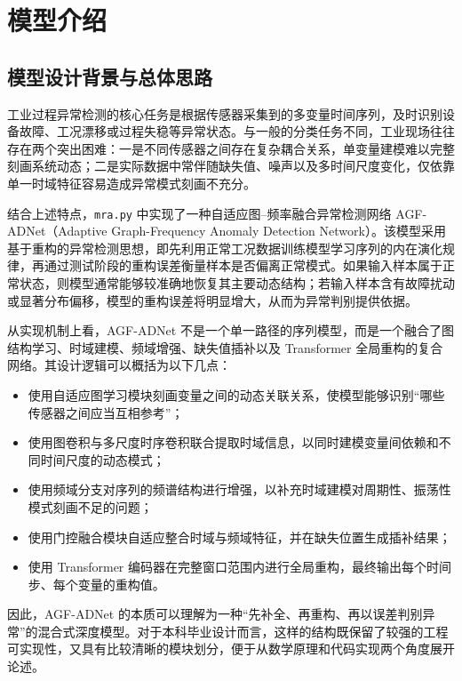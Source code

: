 
\chapter{模型介绍}
\label{chap:model_intro}

\section{模型设计背景与总体思路}

工业过程异常检测的核心任务是根据传感器采集到的多变量时间序列，及时识别设备故障、工况漂移或过程失稳等异常状态。与一般的分类任务不同，工业现场往往存在两个突出困难：一是不同传感器之间存在复杂耦合关系，单变量建模难以完整刻画系统动态；二是实际数据中常伴随缺失值、噪声以及多时间尺度变化，仅依靠单一时域特征容易造成异常模式刻画不充分。

结合上述特点，\texttt{mra.py} 中实现了一种自适应图--频率融合异常检测网络 AGF-ADNet（Adaptive Graph-Frequency Anomaly Detection Network）。该模型采用基于重构的异常检测思想，即先利用正常工况数据训练模型学习序列的内在演化规律，再通过测试阶段的重构误差衡量样本是否偏离正常模式。如果输入样本属于正常状态，则模型通常能够较准确地恢复其主要动态结构；若输入样本含有故障扰动或显著分布偏移，模型的重构误差将明显增大，从而为异常判别提供依据。

从实现机制上看，AGF-ADNet 不是一个单一路径的序列模型，而是一个融合了图结构学习、时域建模、频域增强、缺失值插补以及 Transformer 全局重构的复合网络。其设计逻辑可以概括为以下几点：
\begin{itemize}
    \item 使用自适应图学习模块刻画变量之间的动态关联关系，使模型能够识别“哪些传感器之间应当互相参考”；
    \item 使用图卷积与多尺度时序卷积联合提取时域信息，以同时建模变量间依赖和不同时间尺度的动态模式；
    \item 使用频域分支对序列的频谱结构进行增强，以补充时域建模对周期性、振荡性模式刻画不足的问题；
    \item 使用门控融合模块自适应整合时域与频域特征，并在缺失位置生成插补结果；
    \item 使用 Transformer 编码器在完整窗口范围内进行全局重构，最终输出每个时间步、每个变量的重构值。
\end{itemize}

因此，AGF-ADNet 的本质可以理解为一种“先补全、再重构、再以误差判别异常”的混合式深度模型。对于本科毕业设计而言，这样的结构既保留了较强的工程可实现性，又具有比较清晰的模块划分，便于从数学原理和代码实现两个角度展开论述。


